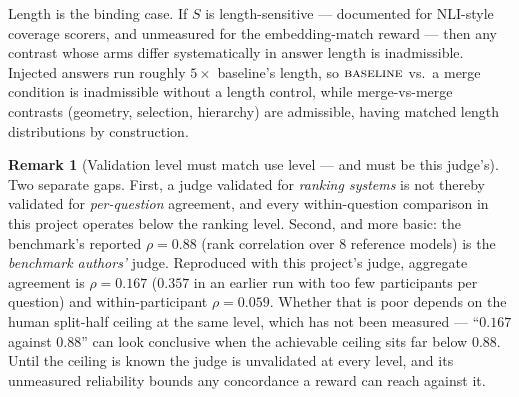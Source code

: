 \documentclass[11pt]{article}
\theoremstyle{definition}
\newtheorem{remark}{Remark}
\newcommand{\1}{\mathbf{1}}
\begin{document}
\noindent
Length is the binding case. If $S$ is length-sensitive --- documented for
NLI-style coverage scorers, and unmeasured for the embedding-match reward ---
then any contrast whose arms differ systematically in answer length is
inadmissible. Injected answers run roughly $5\times$ baseline's length, so
$\textsc{baseline}$ vs.\ a merge condition is inadmissible without a length
control, while merge-vs-merge contrasts (geometry, selection, hierarchy) are
admissible, having matched length distributions by construction.

\begin{remark}[Validation level must match use level --- and must be this judge's]
Two separate gaps. First, a judge validated for \emph{ranking systems} is not
thereby validated for \emph{per-question} agreement, and every within-question
comparison in this project operates below the ranking level. Second, and more
basic: the benchmark's reported $\rho = 0.88$ (rank correlation over 8 reference
models) is the \emph{benchmark authors'} judge. Reproduced with this project's
judge, aggregate agreement is $\rho = 0.167$ ($0.357$ in an earlier run with too
few participants per question) and within-participant $\rho = 0.059$. Whether
that is poor depends on the human split-half ceiling at the same level, which has
not been measured --- ``$0.167$ against $0.88$'' can look conclusive when the
achievable ceiling sits far below $0.88$. Until the ceiling is known the judge is
unvalidated at every level, and its unmeasured reliability bounds any concordance
a reward can reach against it.
\end{remark}
\end{document}
